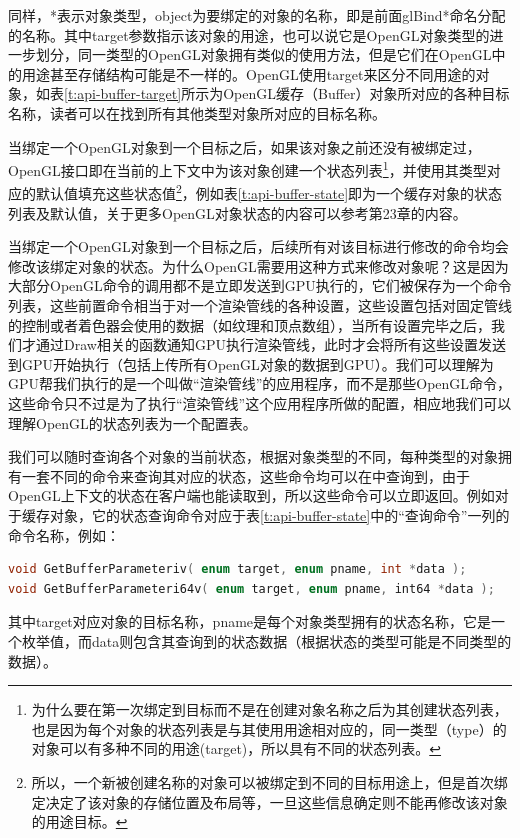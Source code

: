 同样，*表示对象类型，object为要绑定的对象的名称，即是前面glBind*命名分配的名称。其中target参数指示该对象的用途，也可以说它是OpenGL对象类型的进一步划分，同一类型的OpenGL对象拥有类似的使用方法，但是它们在OpenGL中的用途甚至存储结构可能是不一样的。OpenGL使用target来区分不同用途的对象，如表\ref{t:api-buffer-target}所示为OpenGL缓存（Buffer）对象所对应的各种目标名称，读者可以在\cite{b:OpenGL4.5CoreProfile}找到所有其他类型对象所对应的目标名称。

当绑定一个OpenGL对象到一个目标之后，如果该对象之前还没有被绑定过，OpenGL接口即在当前的上下文中为该对象创建一个状态列表\footnote{为什么要在第一次绑定到目标而不是在创建对象名称之后为其创建状态列表，也是因为每个对象的状态列表是与其使用用途相对应的，同一类型（type）的对象可以有多种不同的用途(target)，所以具有不同的状态列表。}，并使用其类型对应的默认值填充这些状态值\footnote{所以，一个新被创建名称的对象可以被绑定到不同的目标用途上，但是首次绑定决定了该对象的存储位置及布局等，一旦这些信息确定则不能再修改该对象的用途目标。}，例如表\ref{t:api-buffer-state}即为一个缓存对象的状态列表及默认值，关于更多OpenGL对象状态的内容可以参考\cite{b:OpenGL4.5CoreProfile}第23章的内容。

当绑定一个OpenGL对象到一个目标之后，后续所有对该目标进行修改的命令均会修改该绑定对象的状态。为什么OpenGL需要用这种方式来修改对象呢？这是因为大部分OpenGL命令的调用都不是立即发送到GPU执行的，它们被保存为一个命令列表，这些前置命令相当于对一个渲染管线的各种设置，这些设置包括对固定管线的控制或者着色器会使用的数据（如纹理和顶点数组），当所有设置完毕之后，我们才通过Draw相关的函数通知GPU执行渲染管线，此时才会将所有这些设置发送到GPU开始执行（包括上传所有OpenGL对象的数据到GPU）。我们可以理解为GPU帮我们执行的是一个叫做“渲染管线”的应用程序，而不是那些OpenGL命令，这些命令只不过是为了执行“渲染管线”这个应用程序所做的配置，相应地我们可以理解OpenGL的状态列表为一个配置表。

我们可以随时查询各个对象的当前状态，根据对象类型的不同，每种类型的对象拥有一套不同的命令来查询其对应的状态，这些命令均可以在\cite{b:OpenGL4.5CoreProfile}中查询到，由于OpenGL上下文的状态在客户端也能读取到，所以这些命令可以立即返回。例如对于缓存对象，它的状态查询命令对应于表\ref{t:api-buffer-state}中的“查询命令”一列的命令名称，例如：

\begin{lstlisting}[language=C++]
void GetBufferParameteriv( enum target, enum pname, int *data );
void GetBufferParameteri64v( enum target, enum pname, int64 *data );
\end{lstlisting}

其中target对应对象的目标名称，pname是每个对象类型拥有的状态名称，它是一个枚举值，而data则包含其查询到的状态数据（根据状态的类型可能是不同类型的数据）。

